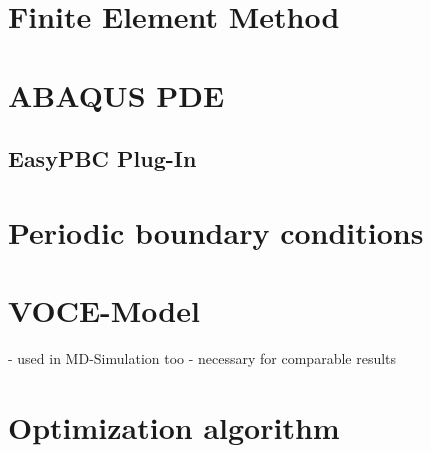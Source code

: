 \section{Finite Element Method}
\section{ABAQUS PDE}
\subsection{EasyPBC Plug-In}

\section{Periodic boundary conditions}

\section{VOCE-Model}

- used in MD-Simulation too
- necessary for comparable results


\section{Optimization algorithm} \label{optimizationAlgorithm}

